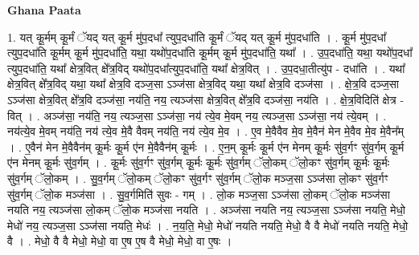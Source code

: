 \documentclass[17pt]{extarticle}
\begin{document}
\textbf{Ghana Paata } \newline

1. यत् कू॒र्मम् कू॒र्मं ॅयद् यत् कू॒र्म मु॑प॒दधा᳚ त्युप॒दधा॑ति कू॒र्मं ॅयद् यत् कू॒र्म मु॑प॒दधा॑ति । . कू॒र्म मु॑प॒दधा᳚ त्युप॒दधा॑ति कू॒र्मम् कू॒र्म मु॑प॒दधा॑ति॒ यथा॒ यथो॑प॒दधा॑ति कू॒र्मम् कू॒र्म मु॑प॒दधा॑ति॒ यथा᳚ । . उ॒प॒दधा॑ति॒ यथा॒ यथो॑प॒दधा᳚ त्युप॒दधा॑ति॒ यथा᳚ क्षेत्र॒वित् क्षे᳚त्र॒विद् यथो॑प॒दधा᳚त्युप॒दधा॑ति॒ यथा᳚ क्षेत्र॒वित् । . उ॒प॒दधा॒तीत्यु॑प - दधा॑ति । . यथा᳚ क्षेत्र॒वित् क्षे᳚त्र॒विद् यथा॒ यथा᳚ क्षेत्र॒वि दञ्ज॒सा ऽञ्ज॑सा क्षेत्र॒विद् यथा॒ यथा᳚ क्षेत्र॒वि दञ्ज॑सा । . क्षे॒त्र॒वि दञ्ज॒सा ऽञ्ज॑सा क्षेत्र॒वित् क्षे᳚त्र॒वि दञ्ज॑सा॒ नय॑ति॒ नय॒ त्यञ्ज॑सा क्षेत्र॒वित् क्षे᳚त्र॒वि दञ्ज॑सा॒ नय॑ति । . क्षे॒त्र॒विदिति॑ क्षेत्र - वित् । . अञ्ज॑सा॒ नय॑ति॒ नय॒ त्यञ्ज॒सा ऽञ्ज॑सा॒ नय॑ त्ये॒व मे॒वम् नय॒ त्यञ्ज॒सा ऽञ्ज॑सा॒ नय॑ त्ये॒वम् । . नय॑त्ये॒व मे॒वम् नय॑ति॒ नय॑ त्ये॒व मे॒वै वैवम् नय॑ति॒ नय॑ त्ये॒व मे॒व । . ए॒व मे॒वैवैव मे॒व मे॒वैन॑ मेन मे॒वैव मे॒व मे॒वैन᳚म् । . ए॒वैन॑ मेन मे॒वैवैन॑म् कू॒र्मः कू॒र्म ए॑न मे॒वैवैन॑म् कू॒र्मः । . ए॒न॒म् कू॒र्मः कू॒र्म ए॑न मेनम् कू॒र्मः सु॑व॒र्गꣳ सु॑व॒र्गम् कू॒र्म ए॑न मेनम् कू॒र्मः सु॑व॒र्गम् । . कू॒र्मः सु॑व॒र्गꣳ सु॑व॒र्गम् कू॒र्मः कू॒र्मः सु॑व॒र्गम् ॅलो॒कम् ॅलो॒कꣳ सु॑व॒र्गम् कू॒र्मः कू॒र्मः सु॑व॒र्गम् ॅलो॒कम् । . सु॒व॒र्गम् ॅलो॒कम् ॅलो॒कꣳ सु॑व॒र्गꣳ सु॑व॒र्गम् ॅलो॒क मञ्ज॒सा ऽञ्ज॑सा लो॒कꣳ सु॑व॒र्गꣳ सु॑व॒र्गम् ॅलो॒क मञ्ज॑सा । . सु॒व॒र्गमिति॑ सुवः - गम् । . लो॒क मञ्ज॒सा ऽञ्ज॑सा लो॒कम् ॅलो॒क मञ्ज॑सा नयति नय॒ त्यञ्ज॑सा लो॒कम् ॅलो॒क मञ्ज॑सा नयति । . अञ्ज॑सा नयति नय॒ त्यञ्ज॒सा ऽञ्ज॑सा नयति॒ मेधो॒ मेधो॑ नय॒ त्यञ्ज॒सा ऽञ्ज॑सा नयति॒ मेधः॑ । . न॒य॒ति॒ मेधो॒ मेधो॑ नयति नयति॒ मेधो॒ वै वै मेधो॑ नयति नयति॒ मेधो॒ वै । . मेधो॒ वै वै मेधो॒ मेधो॒ वा ए॒ष ए॒ष वै मेधो॒ मेधो॒ वा ए॒षः । \newline
\end{document}
